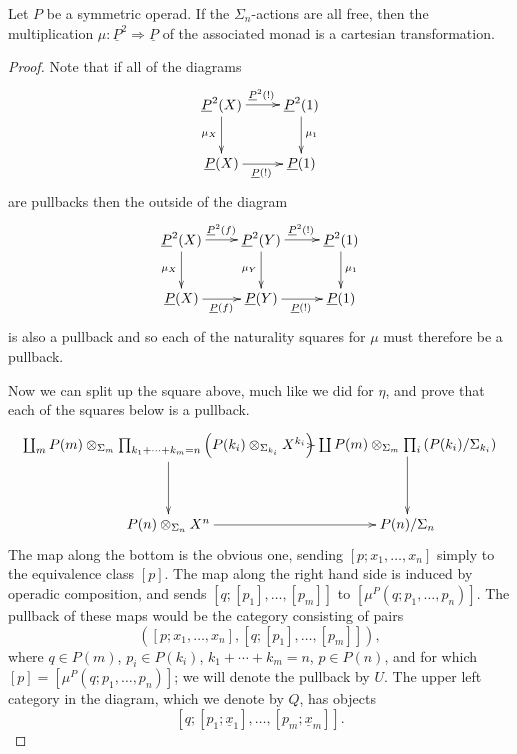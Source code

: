 \begin{prop}\label{prop:mu-2cart}
Let $P$ be a symmetric operad. If the $\Sigma_n$-actions are all free, then the multiplication $\mu \colon  \underline{P}^{2} \Rightarrow \underline{P}$ of the associated monad is a cartesian transformation.
\end{prop}
\begin{proof}
Note that if all of the diagrams
    \[
        \xy
            (0,0)*+{\underline{P}^2(X)}="00";
            (20,0)*+{\underline{P}^2(1)}="10";
            (0,-15)*+{\underline{P}(X)}="01";
            (20,-15)*+{\underline{P}(1)}="11";
            {\ar^{\underline{P}^2(!)} "00" ; "10"};
            {\ar^{\mu_1} "10" ; "11"};
            {\ar_{\mu_X} "00" ; "01"};
            {\ar_{\underline{P}(!)} "01" ; "11"};
        \endxy
    \]
are pullbacks then the outside of the diagram
    \[
        \xy
            (0,0)*+{\underline{P}^2(X)}="00";
            (20,0)*+{\underline{P}^2(Y)}="10";
            (40,0)*+{\underline{P}^2(1)}="20";
            (0,-15)*+{\underline{P}(X)}="01";
            (20,-15)*+{\underline{P}(Y)}="11";
            (40,-15)*+{\underline{P}(1)}="21";
            {\ar^{\underline{P}^2(f)} "00" ; "10"};
            {\ar^{\underline{P}^2(!)} "10" ; "20"};
            {\ar^{\mu_{1}} "20" ; "21"};
            {\ar_{\mu_X} "00" ; "01"};
            {\ar_{\underline{P}(f)} "01" ; "11"};
            {\ar_{\underline{P}(!)} "11" ; "21"};
            {\ar_{\mu_Y} "10" ; "11"};
        \endxy
    \]
is also a pullback and so each of the naturality squares for $\mu$ must therefore be a pullback. 

Now we can split up the square above, much like we did for $\eta$, and prove that each of the squares below is a pullback.
    \[
        \xy
            (0,0)*+{\coprod_{m} P(m) \otimes_{\Sigma_m} \prod_{k_1+\cdots+k_m=n} \left(\coeqsig{P}{X}{{k_i}}\right)}="00";
            (60,0)*+{\coprod P(m) \otimes_{\Sigma_m} \prod_i \left(P(k_i) / \Sigma_{k_i}\right)}="10";
            (0,-20)*+{\coeqsig{P}{X}{n}}="01";
            (60,-20)*+{P(n) / \Sigma_{n}}="11";
            {\ar "00" ; "10"};
            {\ar "00" ; "01"};
            {\ar "01" ; "11"};
            {\ar "10" ; "11"};
        \endxy
    \]
The map along the bottom is the obvious one, sending $[p; x_1, \ldots, x_n]$ simply to the equivalence class $[p]$. The map along the right hand side is induced by operadic composition, and sends $[q;[p_1],\ldots,[p_m]]$ to $[\mu^P(q;p_1,\ldots,p_n)]$. The pullback of these maps would be the category consisting of pairs
    \[
        \left([p;x_1,\ldots,x_{n}],[q;[p_1],\ldots,[p_m]]\right),
    \]
where $q \in P(m)$, $p_i \in P(k_i)$, $k_1 + \cdots + k_m = n$, $p \in P(n)$, and for which $[p] = [\mu^P(q;p_1,\ldots,p_n)]$; we will denote the pullback by $U$. The upper left category in the diagram, which we denote by $Q$, has objects
    \[
        \left[q;\left[p_1;\underline{x}_1\right],\ldots,\left[p_m;\underline{x}_m\right]\right].
    \]


\end{proof}
